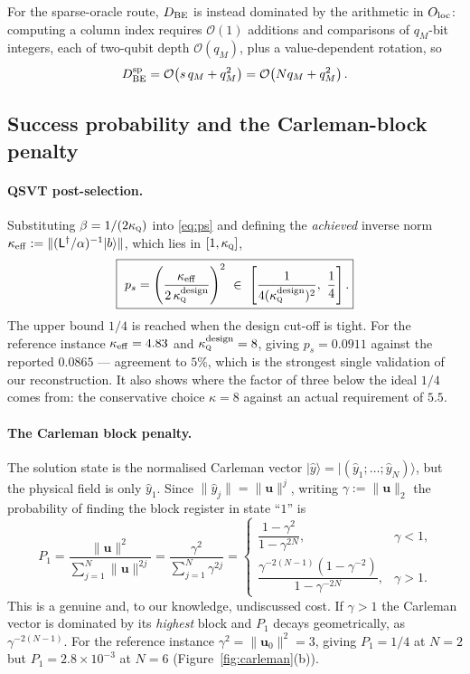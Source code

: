 \documentclass[11pt,a4paper]{article}
\theoremstyle{plain}
\theoremstyle{definition}
\theoremstyle{remark}
\newcommand{\Oh}{\mathcal{O}}
\newcommand{\ket}[1]{\lvert #1 \rangle}
\newcommand{\norm}[1]{\lVert #1 \rVert}
\newcommand{\uvec}{\bm{u}}
\newcommand{\Lmat}{\mathsf{L}}
\newcommand{\kQ}{\kappa_{\textsc{q}}}
\begin{document}
For the sparse-oracle route, $D_{\rm BE}$ is instead dominated by the arithmetic
in $O_{\rm loc}$: computing a column index requires $\Oh(1)$ additions and
comparisons of $q_M$-bit integers, each of two-qubit depth $\Oh(q_M)$, plus a
value-dependent rotation, so
\begin{equation}
D_{\rm BE}^{\rm sp}=\Oh\!\left(s\,q_M+q_M^{2}\right)
=\Oh\!\left(N q_M+q_M^{2}\right).
\label{eq:BEsp}
\end{equation}

\subsection{Success probability and the Carleman-block penalty}
\label{sec:P1}
\label{sec:success}

\paragraph{QSVT post-selection.}  Substituting $\beta=1/(2\kQ)$ into
\eqref{eq:ps} and defining the \emph{achieved} inverse norm
$\kappa_{\rm eff}:=\lVert(\Lmat^\dagger/\alpha)^{-1}\ket{b}\rVert$, which lies in
$[1,\kQ]$,
\begin{equation}
\boxed{\ p_s=\left(\frac{\kappa_{\rm eff}}{2\,\kQ^{\rm design}}\right)^{2}
\ \in\ \left[\frac{1}{4(\kQ^{\rm design})^2},\ \frac14\right].}
\label{eq:psmodel}
\end{equation}
The upper bound $1/4$ is reached when the design cut-off is tight.  For the
reference instance $\kappa_{\rm eff}=4.83$ and $\kQ^{\rm design}=8$, giving
$p_s=0.0911$ against the reported $0.0865$ --- agreement to $5\%$, which is the
strongest single validation of our reconstruction.  It also shows where the
factor of three below the ideal $1/4$ comes from: the conservative choice
$\kappa=8$ against an actual requirement of $5.5$.

\paragraph{The Carleman block penalty.}  The solution state is the normalised
Carleman vector $\ket{\hat y}=\ket{(\hat y_1;\dots;\hat y_N)}$, but the physical
field is only $\hat y_1$.  Since $\norm{\hat y_j}=\norm{\uvec}^j$, writing
$\gamma:=\norm{\uvec}_2$ the probability of finding the block register in state
``$1$'' is
\begin{equation}
\boxed{\ P_1=\frac{\norm{\uvec}^{2}}{\sum_{j=1}^{N}\norm{\uvec}^{2j}}
=\frac{\gamma^{2}}{\sum_{j=1}^{N}\gamma^{2j}}
=\begin{cases}
\dfrac{1-\gamma^{2}}{1-\gamma^{2N}}, & \gamma<1,\\[3mm]
\dfrac{\gamma^{-2(N-1)}(1-\gamma^{-2})}{1-\gamma^{-2N}}, & \gamma>1.
\end{cases}}
\label{eq:P1}
\end{equation}
This is a genuine and, to our knowledge, undiscussed cost.  If $\gamma>1$ the
Carleman vector is dominated by its \emph{highest} block and $P_1$ decays
geometrically, as $\gamma^{-2(N-1)}$.  For the reference instance
$\gamma^2=\norm{\uvec_0}^2=3$, giving $P_1=1/4$ at $N=2$ but $P_1=2.8\times10^{-3}$
at $N=6$ (Figure~\ref{fig:carleman}(b)).
\end{document}
